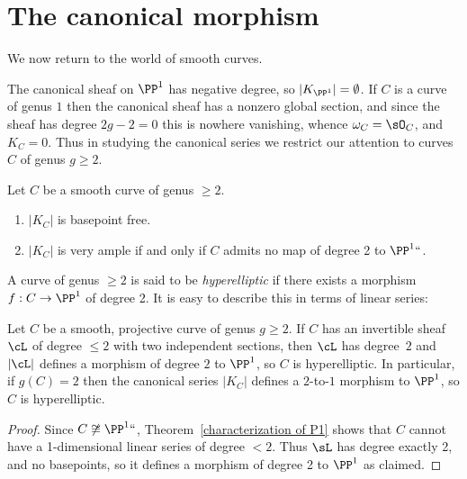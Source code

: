 \section{The canonical morphism}

We now return to the world of smooth curves.
%

 The canonical sheaf on $\PP^1$ has negative degree, so $|K_{\PP^1}| = \emptyset$. If $C$ is a curve
 of genus $1$ then the canonical sheaf     has a nonzero global section, and since the sheaf has degree $2g-2=0$ this is nowhere vanishing, whence
 $\omega_C = \sO_C$, and $K_C = 0$. Thus in studying the canonical series we restrict our attention to curves $C$ of genus $g\geq 2$. 
 
 \begin{theorem}\label{canonical series is very ample} Let $C$ be a smooth curve of genus $\geq 2$.
\begin{enumerate}
 \item $|K_C|$ is basepoint free.
 \item $|K_C|$ is very ample if and only if $C$ admits no map of degree 2 to $\PP^1` `$.
\end{enumerate}
\end{theorem}

A curve of genus $\geq 2$
is said to be \emph{hyperelliptic} if there exists a 
morphism
$f: C \to \PP^1$ 
of degree 2.
%
%
It is easy to describe this in terms of linear series:

\begin{lemma}\label{deg 2 morphism}
Let $C$ be a smooth, projective curve of genus $g\geq 2$. If $C$ has an invertible sheaf $\cL$ of degree $\leq 2$ with two independent sections, then $\cL$ has degree~$2$ and
$|\cL|$ defines a morphism of degree $2$ to $\PP^{1}$, so $C$ is
hyperelliptic. In particular, if $g(C) = 2$ then the canonical series
$|K_{C}|$ defines a $2$-to-$1$ morphism to $\PP^{1}$, so $C$ is
hyperelliptic.
\end{lemma}

\begin{proof}
Since $C \not\cong \PP^1` `$,  Theorem~\ref{characterization of P1} shows that $C$ cannot have a 1-dimensional linear series
of degree $< 2$. Thus $\sL$ has degree exactly 2, and no 
basepoints,
so it defines a morphism of degree 2 to $\PP^1$ as claimed.
\end{proof}

